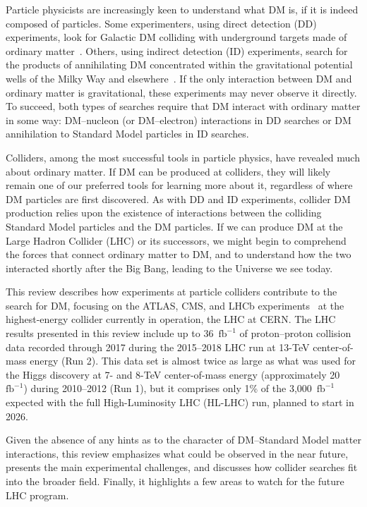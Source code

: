 \documentclass{ar-1col}
\newcommand{\ifb}{\ensuremath{\mathrm{fb}^{-1}}\xspace}
\begin{document}
{Particle physicists are increasingly keen to understand what DM is, if it is indeed composed of particles. 
Some experimenters, using \MakeLowercase{Direct Detection} (DD) experiments, look for Galactic DM
colliding with underground targets made of ordinary matter~\cite{0954-3899-43-1-013001}.
Others, using \MakeLowercase{Indirect Detection} (ID) experiments, search for the products of annihilating DM
concentrated within the gravitational potential wells of the Milky Way and elsewhere~\cite{Gaskins:2016cha}.
If the only interaction between DM and ordinary matter is gravitational, these experiments may never observe
it directly. To succeed, both types of searches require that DM interact
with ordinary matter in some way: DM--nucleon (or DM--electron) interactions
in DD searches or DM annihilation to Standard Model particles in ID searches. 

Colliders, among the most successful tools in particle physics, have revealed much about ordinary matter.  
If DM can be produced at colliders, they will likely remain one of our preferred tools for learning more about it,
regardless of where DM particles are first discovered.
As with DD and ID experiments, collider DM production relies upon the existence of interactions between the
colliding Standard Model particles and the DM particles.
If we can produce DM at the Large Hadron Collider (LHC) or its successors, we might begin to comprehend the forces that connect 
ordinary matter to DM, and to understand how the two interacted
shortly after the Big Bang, leading to the Universe we see today.



This review describes how experiments at particle colliders contribute to the search for DM,
focusing on the ATLAS, CMS, and LHCb experiments~\cite{ATLAS2008,CMS2008,LHCb2008} at the highest-energy
collider currently in operation, the LHC at CERN.
The LHC results presented in this review include up to
36~\ifb of proton--proton collision data recorded through 2017 during 
the 2015--2018 LHC run at 13-TeV center-of-mass energy (Run 2).
This data set is almost twice as large as what was used for the Higgs discovery
at 7- and 8-TeV center-of-mass energy (approximately 20~\ifb) during 2010--2012 (Run 1),
but it comprises only 1\% of the 3,000~\ifb expected with the full High-Luminosity LHC (HL-LHC)
run, planned to start in 2026. 

Given the absence of any hints as to the character of DM--Standard Model
matter interactions, this review emphasizes what could be observed in the near
future, presents the main experimental challenges, and discusses how
collider searches fit into the broader field. Finally, it
highlights a few areas to watch for the future LHC program.

}
\end{document}
